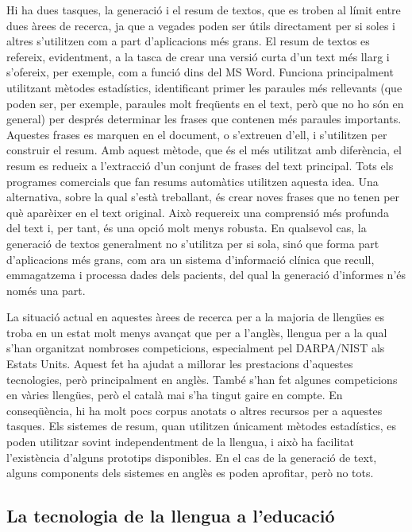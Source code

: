 \documentclass[]{../../metanetpaper}
\begin{document}
\begin{multicols}{2}
Hi ha dues tasques, la generació i el resum de textos, que es troben al límit entre dues àrees de recerca, ja que a vegades poden ser útils directament per si soles i altres s’utilitzen com a part d’aplicacions més grans. El resum de textos es refereix, evidentment, a la tasca de crear una versió curta d’un text més llarg i s’ofereix, per exemple, com a funció dins del MS Word. Funciona principalment utilitzant mètodes estadístics, identificant primer les paraules més rellevants (que poden ser, per exemple, paraules molt freqüents en el text, però que no ho són en general) per després determinar les frases que contenen més paraules importants. Aquestes frases es marquen en el document, o s’extreuen d’ell, i s’utilitzen per construir el resum. Amb aquest mètode, que és el més utilitzat amb diferència, el resum es redueix a l’extracció d’un conjunt de frases del text principal. Tots els programes comercials que fan resums automàtics utilitzen aquesta idea. Una alternativa, sobre la qual s’està treballant, és crear noves frases que no tenen per què aparèixer en el text original. Això requereix una comprensió més profunda del text i, per tant, és una opció molt menys robusta. En qualsevol cas, la generació de textos generalment no s’utilitza per si sola, sinó que forma part d’aplicacions més grans, com ara un sistema d’informació clínica que recull, emmagatzema i processa dades dels pacients, del qual la generació d’informes n’és només una part. 

La situació actual en aquestes àrees de recerca per a la majoria de llengües es troba en un estat molt menys avançat que per a l’anglès, llengua per a la qual s’han organitzat nombroses competicions, especialment pel DARPA/NIST als Estats Units. Aquest fet ha ajudat a millorar les prestacions d’aquestes tecnologies, però principalment en anglès. També s’han fet algunes competicions en vàries llengües, però el català mai s’ha tingut gaire en compte. En conseqüència, hi ha molt pocs corpus anotats o altres recursos per a aquestes tasques. Els sistemes de resum, quan utilitzen únicament mètodes estadístics, es poden utilitzar sovint independentment de la llengua, i això ha facilitat l’existència d’alguns prototips disponibles. En el cas de la generació de text, alguns components dels sistemes en anglès es poden aprofitar, però no tots. 

\subsection{La tecnologia de la llengua a l’educació}


\end{multicols}
\end{document}
